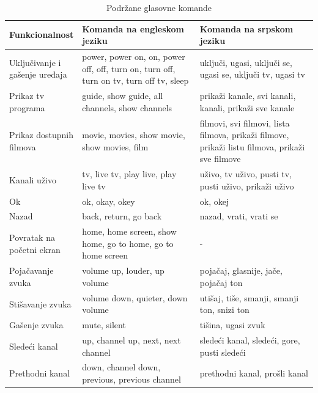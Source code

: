 \documentclass[implementacija.tex]{subfiles}
\begin{document}
\begin{table}
\centering
\caption{Podržane glasovne komande}
\label{tbl:komande}
\begin{tabular}{p{0.2\linewidth} | p{0.4\linewidth}p{0.4\linewidth}}
\toprule
Funkcionalnost & Komanda na engleskom jeziku & Komanda na srpskom jeziku \\
\toprule
Uključivanje i gašenje uređaja&power, power on, on, power off, off, turn on, turn off, turn on tv, turn off tv, sleep & uključi, ugasi, uključi se, ugasi se, uključi tv, ugasi tv\\\midrule
Prikaz tv programa &guide, show guide, all channels, show channels &prikaži kanale, svi kanali, kanali, prikaži sve kanale\\\midrule
Prikaz dostupnih filmova&movie, movies, show movie, show movies, film&filmovi, svi filmovi, lista filmova, prikaži filmove, prikaži listu filmova, prikaži sve filmove \\\midrule
Kanali uživo&tv, live tv, play live, play live tv&uživo, tv uživo, pusti tv, pusti uživo, prikaži uživo \\\midrule
Ok &ok, okay, okey&ok, okej \\\midrule
Nazad&back, return, go back&nazad, vrati, vrati se\\\midrule
Povratak na početni ekran&home, home screen, show home, go to home, go to home screen& -\\\midrule
Pojačavanje zvuka&volume up, louder, up volume&pojačaj, glasnije, jače, pojačaj ton\\\midrule
Stišavanje zvuka&volume down, quieter, down volume&utišaj, tiše, smanji, smanji ton, snizi ton\\\midrule
Gašenje zvuka&mute, silent&tišina, ugasi zvuk \\\midrule
Sledeći kanal&up, channel up, next, next channel&sledeći kanal, sledeći, gore, pusti sledeći \\\midrule
Prethodni kanal&down, channel down, previous, previous channel&prethodni kanal, prošli kanal \\
\bottomrule
\end{tabular}
\end{table}
\end{document}
